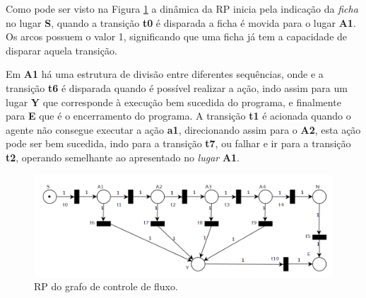 Como pode ser visto na Figura \ref{fig:cf_rp} a dinâmica da RP inicia pela indicação da \textit{ficha} no lugar \textbf{S}, quando a transição \textbf{t0} é disparada a ficha é movida para o lugar \textbf{A1}. Os arcos possuem o valor 1, significando que uma ficha já tem a capacidade de disparar aquela transição.

Em \textbf{A1} há uma estrutura de divisão entre diferentes sequências, onde e a transição \textbf{t6} é disparada quando é possível realizar a ação, indo assim para um lugar \textbf{Y} que corresponde à execução bem sucedida do programa, e finalmente para \textbf{E} que é o encerramento do programa. A transição \textbf{t1} é acionada quando o agente não consegue executar a ação \textbf{a1}, direcionando assim para o \textbf{A2}, esta ação pode ser bem sucedida, indo para a transição \textbf{t7}, ou falhar e ir para a transição \textbf{t2}, operando semelhante ao apresentado no \textit{lugar} \textbf{A1}.


\begin{figure}[ht]
    \centering
    \includegraphics[scale=0.4]{imagens/4-fluxo-rp2.png}
    \caption{RP do grafo de controle de fluxo.}
    \label{fig:cf_rp}
\end{figure}

